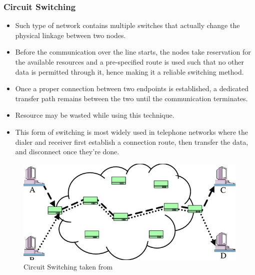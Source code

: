 \documentclass{home_assignment}
\begin{document}
\subsubsection*{Circuit Switching}
\begin{itemize}
\item Such type of network contains multiple switches that actually change the physical linkage between two nodes.
\item Before the communication over the line starts, the nodes take reservation for the available resources and a pre-specified route is used such that no other data is permitted through it, hence making it a reliable switching method.
\item Once a proper connection between two endpoints is established, a dedicated transfer path remains between the two until the communication terminates.
\item Resource may be wasted while using this technique.
\item This form of switching is most widely used in telephone networks where the dialer and receiver first establish a connection route, then transfer the data, and disconnect once they're done.
\end{itemize}
\begin{figure}[H]
\centering
\includegraphics[scale=1.5]{./Figures/cktswitching.jpg}
\caption{Circuit Switching taken from \cite{cktswitching}}
\label{fig:cktswitching}
\end{figure}
\end{document}
